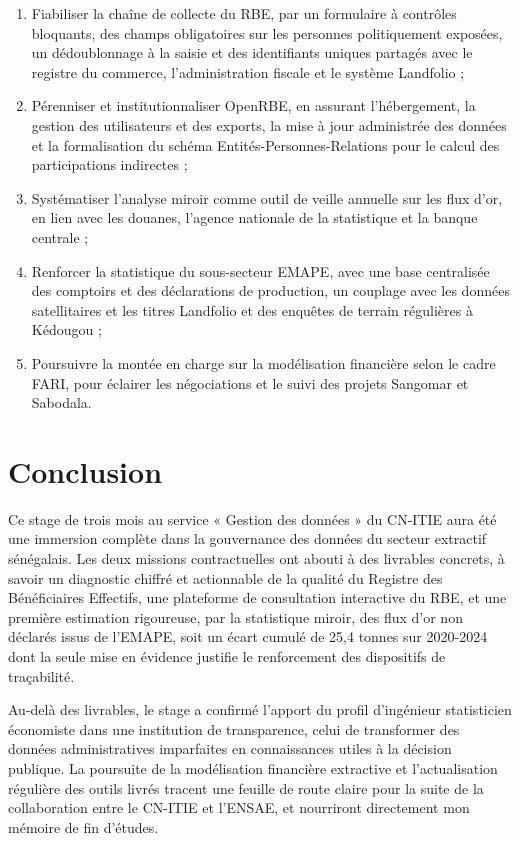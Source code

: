 \documentclass[12pt, a4paper]{article}
\begin{document}
\begin{enumerate}
  \item Fiabiliser la chaîne de collecte du RBE, par un formulaire à
  contrôles bloquants, des champs obligatoires sur les personnes politiquement
  exposées, un dédoublonnage à la saisie et des identifiants uniques partagés
  avec le registre du commerce, l'administration fiscale et le système
  Landfolio ;
  \item Pérenniser et institutionnaliser OpenRBE, en assurant
  l'hébergement, la gestion des utilisateurs et des exports, la mise à jour
  administrée des données et la formalisation du schéma
  Entités-Personnes-Relations pour le calcul des participations indirectes ;
  \item Systématiser l'analyse miroir comme outil de veille annuelle
  sur les flux d'or, en lien avec les douanes, l'agence nationale de la statistique et la banque
  centrale ;
  \item Renforcer la statistique du sous-secteur EMAPE, avec une base
  centralisée des comptoirs et des déclarations de production, un couplage avec
  les données satellitaires et les titres Landfolio et des enquêtes de terrain
  régulières à Kédougou ;
  \item Poursuivre la montée en charge sur la modélisation financière selon le
  cadre FARI, pour éclairer les négociations et le suivi des projets Sangomar
  et Sabodala.
\end{enumerate}

\section{Conclusion}

Ce stage de trois mois au service « Gestion des données » du CN-ITIE aura été
une immersion complète dans la gouvernance des données du secteur extractif
sénégalais. Les deux missions contractuelles ont abouti à des livrables
concrets, à savoir un diagnostic chiffré et actionnable de la qualité du Registre des
Bénéficiaires Effectifs, une plateforme de consultation interactive du RBE, et
une première estimation rigoureuse, par la statistique miroir, des flux d'or
non déclarés issus de l'EMAPE, soit un écart cumulé de 25,4 tonnes sur
2020-2024 dont la seule mise en évidence justifie le renforcement des
dispositifs de traçabilité.

Au-delà des livrables, le stage a confirmé l'apport du profil d'ingénieur
statisticien économiste dans une institution de transparence, celui de transformer des
données administratives imparfaites en connaissances utiles à la décision
publique. La poursuite de la modélisation financière extractive et l'actualisation
régulière des outils livrés tracent une feuille de route claire pour la suite
de la collaboration entre le CN-ITIE et l'ENSAE, et nourriront directement mon
mémoire de fin d'études.
\end{document}
